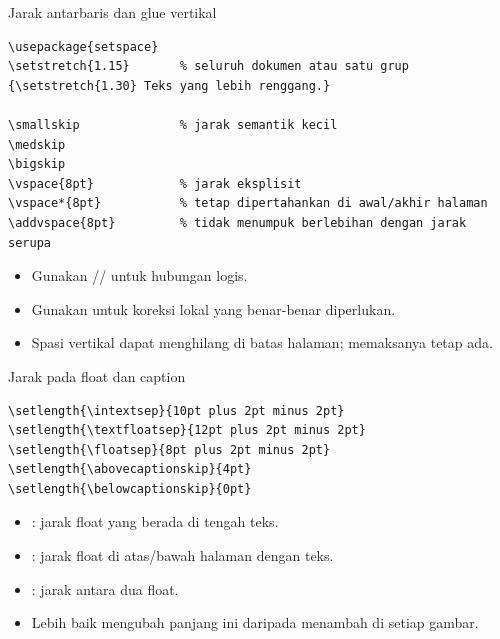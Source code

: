 \documentclass[aspectratio=169,11pt]{beamer}
\newcommand{\dimensi}[1]{\texttt{\detokenize{#1}}}
\begin{document}
\begin{frame}[fragile]{Jarak antarbaris dan glue vertikal}
\begin{lstlisting}
\usepackage{setspace}
\setstretch{1.15}       % seluruh dokumen atau satu grup
{\setstretch{1.30} Teks yang lebih renggang.}

\smallskip              % jarak semantik kecil
\medskip
\bigskip
\vspace{8pt}            % jarak eksplisit
\vspace*{8pt}           % tetap dipertahankan di awal/akhir halaman
\addvspace{8pt}         % tidak menumpuk berlebihan dengan jarak serupa
\end{lstlisting}
\begin{itemize}
  \item Gunakan \dimensi{\smallskip}/\dimensi{\medskip}/\dimensi{\bigskip} untuk hubungan logis.
  \item Gunakan \dimensi{\vspace} untuk koreksi lokal yang benar-benar diperlukan.
  \item Spasi vertikal dapat menghilang di batas halaman; \dimensi{\vspace*} memaksanya tetap ada.
\end{itemize}
\end{frame}

\begin{frame}[fragile]{Jarak pada float dan caption}
\begin{lstlisting}
\setlength{\intextsep}{10pt plus 2pt minus 2pt}
\setlength{\textfloatsep}{12pt plus 2pt minus 2pt}
\setlength{\floatsep}{8pt plus 2pt minus 2pt}
\setlength{\abovecaptionskip}{4pt}
\setlength{\belowcaptionskip}{0pt}
\end{lstlisting}
\begin{itemize}
  \item \dimensi{\intextsep}: jarak float yang berada di tengah teks.
  \item \dimensi{\textfloatsep}: jarak float di atas/bawah halaman dengan teks.
  \item \dimensi{\floatsep}: jarak antara dua float.
  \item Lebih baik mengubah panjang ini daripada menambah \dimensi{\vspace} di setiap gambar.
\end{itemize}
\end{frame}
\end{document}
